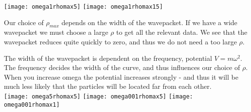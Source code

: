 \documentclass[a4paper,12pt, english]{article}
\begin{document}
\texttt{[image: omega1rhomax5]}
\texttt{[image: omega1rhomax15]}

Our choice of $\rho_{max}$ depends on the width of the wavepacket. If we have a wide wavepacket we must choose a large $\rho$ to get all the relevant data. We see that the wavepacket reduces quite quickly to zero, and thus we do not need a too large $\rho$.  

The width of the wavepacket is dependent on the frequency, potential $V = m \omega ^ 2$. The frequency decides the width of the curve, and thus influences our choice of $\rho$. \\ 

When you increase omega the potential increases strongly - and thus it will be much less likely that the particles will be located far from each other.  \\

\texttt{[image: omega5rhomax5]}
\texttt{[image: omega001rhomax5]}
\texttt{[image: omega001rhomax1]}
\end{document}
